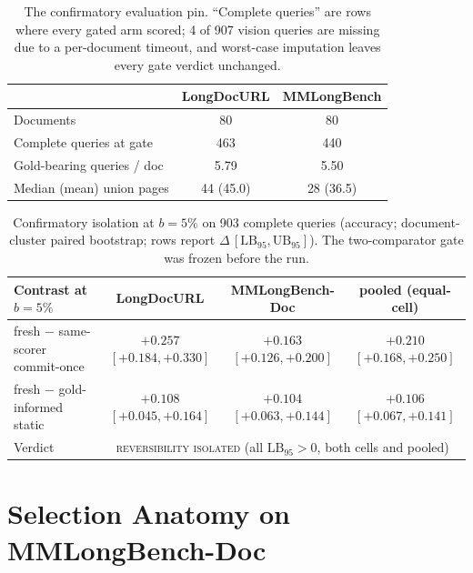 \documentclass[letterpaper]{article} %
\newcommand{\lb}{\mathrm{LB}_{95}}
\begin{document}
\begin{table}[t]
\centering\small
\setlength{\tabcolsep}{4pt}%
\begin{tabular}{lcc}
\toprule
 & LongDocURL & MMLongBench \\
\midrule
Documents & 80 & 80 \\
Complete queries at gate & 463 & 440 \\
Gold-bearing queries / doc & 5.79 & 5.50 \\
Median (mean) union pages & 44 (45.0) & 28 (36.5) \\
\bottomrule
\end{tabular}
\caption{The confirmatory evaluation pin. ``Complete queries'' are rows where every gated arm scored; 4 of 907 vision queries are missing due to a per-document timeout, and worst-case imputation leaves every gate verdict unchanged.}
\label{tab:pins}
\end{table}

\begin{table}[t]
\centering\small
\begin{tabular}{lccc}
\toprule
Contrast at $b{=}5\%$ & LongDocURL & MMLongBench-Doc & pooled (equal-cell) \\
\midrule
fresh $-$ same-scorer commit-once & $+0.257$ $[+0.184,+0.330]$ & $+0.163$ $[+0.126,+0.200]$ & $+0.210$ $[+0.168,+0.250]$ \\
fresh $-$ gold-informed static & $+0.108$ $[+0.045,+0.164]$ & $+0.104$ $[+0.063,+0.144]$ & $+0.106$ $[+0.067,+0.141]$ \\
\midrule
Verdict & \multicolumn{3}{c}{\textsc{reversibility isolated} (all $\lb > 0$, both cells and pooled)} \\
\bottomrule
\end{tabular}
\caption{Confirmatory isolation at $b{=}5\%$ on 903 complete queries (accuracy; document-cluster paired bootstrap; rows report $\Delta\,[\lb,\mathrm{UB}_{95}]$). The two-comparator gate was frozen before the run.}
\label{tab:isolation}
\end{table}

\section{Selection Anatomy on MMLongBench-Doc}\label{app:anatomy}
\end{document}
